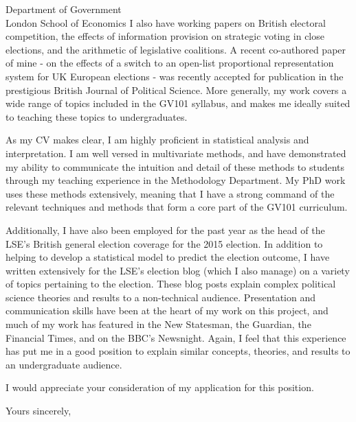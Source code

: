 \documentclass{letter} %
\begin{document}
\begin{letter}{Department of Government \\
London School of Economics}
I also have working papers on British electoral competition, the effects of information provision on strategic voting in close elections, and the arithmetic of legislative coalitions. A recent co-authored paper of mine - on the effects of a switch to an open-list proportional representation system for UK European elections - was recently accepted for publication in the prestigious British Journal of Political Science. More generally, my work covers a wide range of topics included in the GV101 syllabus, and makes me ideally suited to teaching these topics to undergraduates.

\noindent As my CV makes clear, I am highly proficient in statistical analysis and interpretation. I am well versed in multivariate methods, and have demonstrated my ability to communicate the intuition and detail of these methods to students through my teaching experience in the Methodology Department. My PhD work uses these methods extensively, meaning that I have a strong command of the relevant techniques and methods that form a core part of the GV101 curriculum.

Additionally, I have also been employed for the past year as the head of the LSE's British general election coverage for the 2015 election. In addition to helping to develop a statistical model to predict the election outcome, I have written extensively for the LSE's election blog (which I also manage) on a variety of topics pertaining to the election. These blog posts explain complex political science theories and results to a non-technical audience. Presentation and communication skills have been at the heart of my work on this project, and much of my work has featured in the New Statesman, the Guardian, the Financial Times, and on the BBC's Newsnight. Again, I feel that this experience has put me in a good position to explain similar concepts, theories, and results to an undergraduate audience.
 
\noindent I would appreciate your consideration of my application for this position.
 
\closing{Yours sincerely,} 
 

 


\end{letter}
 
\end{document}
